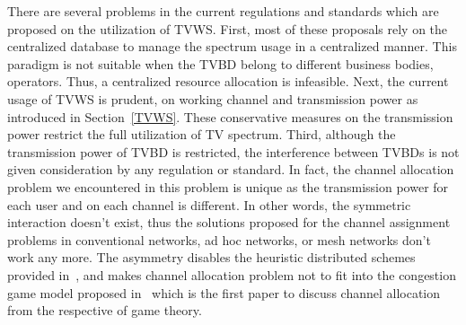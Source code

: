 There are several problems in the current regulations and standards which are proposed on the utilization of TVWS.
First, most of these proposals rely on the centralized database to manage the spectrum usage in a centralized manner.
This paradigm is not suitable when the TVBD belong to different business bodies, \ie operators.
Thus, a centralized resource allocation is infeasible.
Next, the current usage of TVWS is prudent, \ie on working channel and transmission power as introduced in Section~\ref{TVWS}.
These conservative measures on the transmission power restrict the full utilization of TV spectrum.
Third, although the transmission power of TVBD is restricted, the interference between TVBDs is not given consideration by any regulation or standard.
In fact, the channel allocation problem we encountered in this problem is unique as the transmission power for each user and on each channel is different.
In other words, the symmetric interaction doesn't exist, thus the solutions proposed for the channel assignment problems in conventional networks, \eg ad hoc networks, or mesh networks don't work any more.
The asymmetry disables the heuristic distributed schemes provided in~\cite{Ko_DistributedCA}, and makes channel allocation problem not to fit into the congestion game model proposed in~\cite{allerton08_liu} which is the first paper to discuss channel allocation from the respective of game theory.








